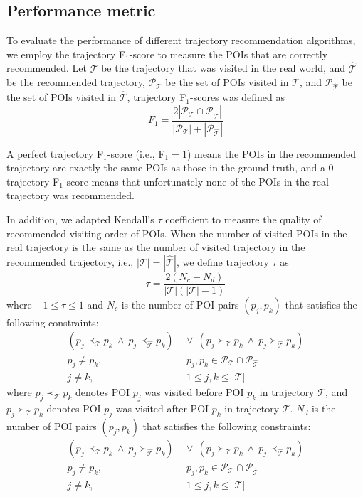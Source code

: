 \subsection{Performance metric}
\label{metric}
%
To evaluate the performance of different trajectory recommendation algorithms,
we employ the trajectory F$_1$-score\cite{ijcai15} to measure the POIs that are
correctly recommended. Let $\mathcal{T}$ be the trajectory that was visited in the real world,
and $\hat{\mathcal{T}}$ be the recommended trajectory,
$\mathcal{P}_{\mathcal{T}}$ be the set of POIs visited in $\mathcal{T}$,
and $\mathcal{P}_{\hat{\mathcal{T}}}$ be the set of POIs visited in $\hat{\mathcal{T}}$,
trajectory F$_1$-scores was defined as
\begin{displaymath}
    F_1 = \frac{2 |\mathcal{P}_{\mathcal{T}} \cap \mathcal{P}_{\hat{\mathcal{T}}}|}
               {|\mathcal{P}_{\mathcal{T}}| + |\mathcal{P}_{\hat{\mathcal{T}}}|}
\end{displaymath}

A perfect trajectory F$_1$-score (i.e., F$_1 = 1$) means the POIs in the recommended trajectory are exactly
the same POIs as those in the ground truth, and a $0$ trajectory F$_1$-score means that unfortunately none of
the POIs in the real trajectory was recommended.

In addition, we adapted Kendall's $\tau$ coefficient \cite{kendalltau} to measure the quality of
recommended visiting order of POIs.
When the number of visited POIs in the real trajectory is the same
as the number of visited trajectory in the recommended trajectory,
i.e., $|\mathcal{T}| = |\hat{\mathcal{T}}|$,
we define trajectory $\tau$ as
\begin{displaymath}
    \tau = \frac{2(N_c - N_d)}{|\mathcal{T}|(|\mathcal{T}|-1)}
\end{displaymath}
where $-1 \le \tau \le 1$ and $N_c$ is the number of POI pairs $(p_j, p_k)$ that satisfies the following constraints:
\begin{align*}
    (p_j \prec_{\mathcal{T}} p_k ~\land~ p_j \prec_{\hat{\mathcal{T}}} p_k) & ~\lor~
    (p_j \succ_{\mathcal{T}} p_k ~\land~ p_j \succ_{\hat{\mathcal{T}}} p_k) \\
    p_j \ne p_k, &~~ p_j, p_k \in \mathcal{P}_{\mathcal{T}} \cap \mathcal{P}_{\hat{\mathcal{T}}} \\
    j \ne k, &~~ 1 \le j, k \le |\mathcal{T}|
\end{align*}
where $p_j \prec_{\mathcal{T}} p_k$ denotes POI $p_j$ was visited before POI $p_k$ in trajectory $\mathcal{T}$,
and $p_j \succ_{\mathcal{T}} p_k$ denotes POI $p_j$ was visited after POI $p_k$ in trajectory $\mathcal{T}$.
$N_d$ is the number of POI pairs $(p_j, p_k)$ that satisfies the following constraints:
\begin{align*}
    (p_j \prec_{\mathcal{T}} p_k ~\land~ p_j \succ_{\hat{\mathcal{T}}} p_k) & ~\lor~
    (p_j \succ_{\mathcal{T}} p_k ~\land~ p_j \prec_{\hat{\mathcal{T}}} p_k) \\
    p_j \ne p_k, &~~ p_j, p_k \in \mathcal{P}_{\mathcal{T}} \cap \mathcal{P}_{\hat{\mathcal{T}}} \\
    j \ne k, &~~ 1 \le j, k \le |\mathcal{T}|
\end{align*}

